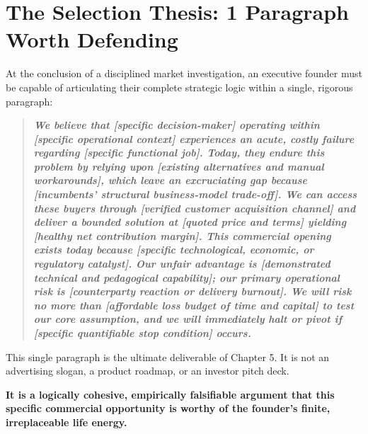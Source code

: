 \section{The Selection Thesis: 1 Paragraph Worth Defending}

At the conclusion of a disciplined market investigation, an executive founder must be capable of articulating their complete strategic logic within a single, rigorous paragraph:

\begin{quote}
\bfseries\itshape
We believe that \textbf{[specific decision-maker]} operating within \textbf{[specific operational context]} experiences an acute, costly failure regarding \textbf{[specific functional job]}. Today, they endure this problem by relying upon \textbf{[existing alternatives and manual workarounds]}, which leave an excruciating gap because \textbf{[incumbents' structural business-model trade-off]}. We can access these buyers through \textbf{[verified customer acquisition channel]} and deliver a bounded solution at \textbf{[quoted price and terms]} yielding \textbf{[healthy net contribution margin]}. This commercial opening exists today because \textbf{[specific technological, economic, or regulatory catalyst]}. Our unfair advantage is \textbf{[demonstrated technical and pedagogical capability]}; our primary operational risk is \textbf{[counterparty reaction or delivery burnout]}. We will risk no more than \textbf{[affordable loss budget of time and capital]} to test our core assumption, and we will immediately halt or pivot if \textbf{[specific quantifiable stop condition]} occurs.
\end{quote}

This single paragraph is the ultimate deliverable of Chapter 5. It is not an advertising slogan, a product roadmap, or an investor pitch deck.

\textbf{It is a logically cohesive, empirically falsifiable argument that this specific commercial opportunity is worthy of the founder's finite, irreplaceable life energy.}
